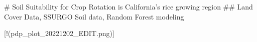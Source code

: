 # Soil Suitability for Crop Rotation is California's rice growing region  
## Land Cover Data, SSURGO Soil data, Random Forest modeling  



[!(pdp_plot_20221202_EDIT.png)]
